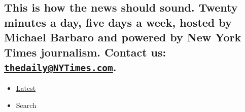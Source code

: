 \hypertarget{this-is-how-the-news-should-sound-twenty-minutes-a-day-five-days-a-week-hosted-by-michael-barbaro-and-powered-by-new-york-times-journalism-contact-us-thedailynytimescom-1}{%
\subsection{\texorpdfstring{This is how the news should sound. Twenty
minutes a day, five days a week, hosted by Michael Barbaro and powered
by New York Times journalism. Contact us:
\href{mailto:thedaily@NYTimes.com}{\nolinkurl{thedaily@NYTimes.com}}.}{This is how the news should sound. Twenty minutes a day, five days a week, hosted by Michael Barbaro and powered by New York Times journalism. Contact us: thedaily@NYTimes.com.}}\label{this-is-how-the-news-should-sound-twenty-minutes-a-day-five-days-a-week-hosted-by-michael-barbaro-and-powered-by-new-york-times-journalism-contact-us-thedailynytimescom-1}}

\begin{itemize}
\tightlist
\item
  \protect\hyperlink{stream-panel}{Latest}
\item
  Search
\end{itemize}

